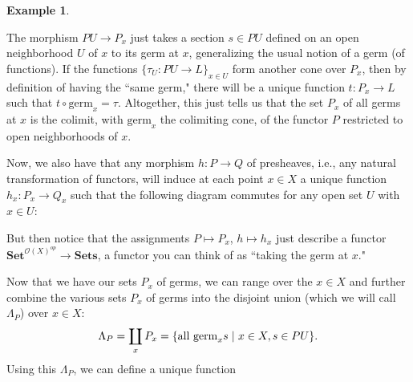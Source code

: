 \documentclass[a4paper]{book}
\theoremstyle{definition}
\newtheorem{example}{Example}[section]
\theoremstyle{definition}
\theoremstyle{definition}
\theoremstyle{theorem}
\theoremstyle{definition}
\begin{document}
\begin{example}
	\begin{center} 
	\end{center} 
	The morphism $PU \rightarrow P_x$ just takes a section $s \in PU$ defined on an open neighborhood $U$ of $x$ to its germ at $x$, generalizing the usual notion of a germ (of functions). If the functions $\{\tau_U: PU \rightarrow L\}_{x \in U}$ form another cone over $P_x$, then by definition of having the ``same germ," there will be a unique function $t: P_x \rightarrow L$ such that $t \circ \text{germ}_x = \tau$. Altogether, this just tells us that the set $P_x$ of all germs at $x$ is the colimit, with $\text{germ}_x$ the colimiting cone, of the functor $P$ restricted to open neighborhoods of $x$. \par 
	Now, we also have that any morphism $h: P \rightarrow Q$ of presheaves, i.e., any natural transformation of functors, will induce at each point $x \in X$ a unique function $h_x: P_x \rightarrow Q_x$ such that the following diagram commutes for any open set $U$ with $x \in U$: 
	\begin{center} 
	\end{center}  
	But then notice that the assignments $P \mapsto P_x$, $h \mapsto h_x$ just describe a functor $\textbf{Set}^{\mathscr{O}(X)^{op}} \rightarrow \textbf{Sets}$, a functor you can think of as ``taking the germ at $x$." \par
	Now that we have our sets $P_x$ of germs, we can range over the $x \in X$ and further combine the various sets $P_x$ of germs into the disjoint union (which we will call $\Lambda_P$) over $x \in X$: 
	\begin{equation}
	\Lambda_P = \coprod_x P_x = \{\text{all } \text{germ}_x s \hspace*{0.3em}| \hspace*{0.3em} x \in X, s \in PU\}.
	\end{equation}
	Using this $\Lambda_P$, we can define a unique function 

\end{example}
\end{document}
